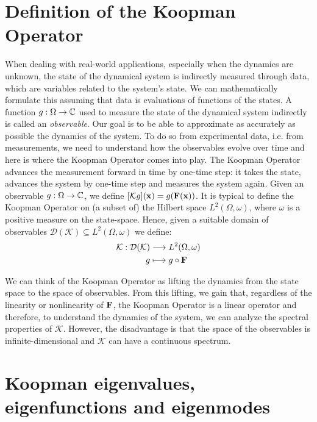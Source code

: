 \section{Definition of the Koopman Operator}
When dealing with real-world applications, especially when the dynamics are unknown, the state of the dynamical system is indirectly measured through data, which are variables related to the system's state. We can mathematically formulate this assuming that data is evaluations of functions of the states. A function $g:\Omega\to\mathbb{C}$ used to measure the state of the dynamical system indirectly is called an \emph{observable}. 
Our goal is to be able to approximate as accurately as possible the dynamics of the system. To do so from experimental data, i.e. from measurements, we need to understand how the observables evolve over time and here is where the Koopman Operator comes into play. The Koopman Operator advances the measurement forward in time by one-time step: it takes the state, advances the system by one-time step and measures the system again. Given an observable $g:\Omega\to\mathbb{C}$, we define $[\mathcal{K}g](\vb{x}) = g(\vb{F}(\vb{x}))$. It is typical to define the Koopman Operator on (a subset of) the Hilbert space $L^2(\Omega, \omega)$, where $\omega$ is a positive measure on the state-space. Hence, given a suitable domain of observables $\mathcal{D}(\mathcal{K}) \subseteq L^2(\Omega, \omega)$ we define:
\begin{equation}
    \label{koopman_def}
    \begin{split}
       \mathcal{K} : \mathcal{D}(\mathcal{K}) &\longrightarrow L^2(\Omega, \omega)
       \\
       g & \longmapsto g \circ \vb{F}
    \end{split}    
\end{equation}

We can think of the Koopman Operator as lifting the dynamics from the state space to the space of observables. From this lifting, we gain that, regardless of the linearity or nonlinearity of $\vb{F}$, the Koopman Operator is a linear operator and therefore, to understand the dynamics of the system, we can analyze the spectral properties of $\mathcal{K}$. However, the disadvantage is that the space of the observables is infinite-dimensional and $\mathcal{K}$ can have a continuous spectrum. 

\section{Koopman eigenvalues, eigenfunctions and eigenmodes}

